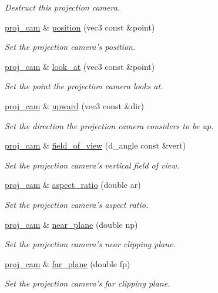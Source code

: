 \begin{DoxyCompactItemize}
\begin{DoxyCompactList}\small\item\em Destruct this projection camera. \end{DoxyCompactList}\item 
\hyperlink{classgfx_1_1proj__cam}{proj\-\_\-cam} \& \hyperlink{classgfx_1_1proj__cam_ae4787d17c3c026fc142405ed926f5197}{position} (vec3 const \&point)
\begin{DoxyCompactList}\small\item\em Set the projection camera's position. \end{DoxyCompactList}\item 
\hyperlink{classgfx_1_1proj__cam}{proj\-\_\-cam} \& \hyperlink{classgfx_1_1proj__cam_adc330250e18123f712e295270ab82e8d}{look\-\_\-at} (vec3 const \&point)
\begin{DoxyCompactList}\small\item\em Set the point the projection camera looks at. \end{DoxyCompactList}\item 
\hyperlink{classgfx_1_1proj__cam}{proj\-\_\-cam} \& \hyperlink{classgfx_1_1proj__cam_a4a56dae9f390db460f573a128786580f}{upward} (vec3 const \&dir)
\begin{DoxyCompactList}\small\item\em Set the direction the projection camera considers to be up. \end{DoxyCompactList}\item 
\hyperlink{classgfx_1_1proj__cam}{proj\-\_\-cam} \& \hyperlink{classgfx_1_1proj__cam_ad6e333007f9a943e4fa4ffdd49d46fd7}{field\-\_\-of\-\_\-view} (d\-\_\-angle const \&vert)
\begin{DoxyCompactList}\small\item\em Set the projection camera's vertical field of view. \end{DoxyCompactList}\item 
\hyperlink{classgfx_1_1proj__cam}{proj\-\_\-cam} \& \hyperlink{classgfx_1_1proj__cam_ad8982cf936ac2ca092c428783ba4b43a}{aspect\-\_\-ratio} (double ar)
\begin{DoxyCompactList}\small\item\em Set the projection camera's aspect ratio. \end{DoxyCompactList}\item 
\hyperlink{classgfx_1_1proj__cam}{proj\-\_\-cam} \& \hyperlink{classgfx_1_1proj__cam_a43d03b8818766ea972cd0253e6207c3f}{near\-\_\-plane} (double np)
\begin{DoxyCompactList}\small\item\em Set the projection camera's near clipping plane. \end{DoxyCompactList}\item 
\hyperlink{classgfx_1_1proj__cam}{proj\-\_\-cam} \& \hyperlink{classgfx_1_1proj__cam_abc2f979a40f4467fce33b90d752cdbfa}{far\-\_\-plane} (double fp)
\begin{DoxyCompactList}\small\item\em Set the projection camera's far clipping plane. \end{DoxyCompactList}\end{DoxyCompactItemize}
